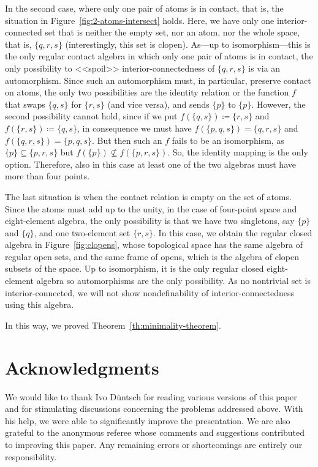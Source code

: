 \documentclass[a4paper,12pt]{amsart}
\numberwithin{equation}{section}
\theoremstyle{mytheoremstyle}
\begin{document}
In the second case, where only one pair of atoms is in contact, that is, the situation
in Figure~\ref{fig:2-atoms-intersect} holds. Here, we have only one interior-connected
set that is neither the empty set, nor an atom, nor the whole space, that is,
$\{q,r,s\}$ (interestingly, this set is clopen).
As---up to isomorphism---this is the only regular contact algebra in which
only one pair of atoms is in contact, the only possibility to <<spoil>>
interior-connectedness of $\{q,r,s\}$ is via an automorphism. Since such
an automorphism must, in particular, preserve contact on atoms, the only
two possibilities are the identity relation or the function $f$ that swaps
$\{q,s\}$ for $\{r,s\}$ (and vice versa), and sends $\{p\}$ to
$\{p\}$. However, the second possibility cannot hold, since if we put
$f(\{q,s\})\coloneqq \{r,s\}$ and $f(\{r,s\})\coloneqq \{q,s\}$, in consequence
we must have $f(\{p,q,s\})=\{q,r,s\}$ and $f(\{q,r,s\})=\{p,q,s\}$. But
then such an $f$ fails to be an isomorphism, as
$\{p\}\subseteq \{p,r,s\}$ but $f(\{p\})\nsubseteq f(\{p,r,s\})$. So, the
identity mapping is the only option. Therefore, also in this case at least
one of the two algebras must have more than four points.


The last situation is when the contact relation is empty on the set of
atoms. Since the atoms must add up to the unity, in the case of four-point
space and eight-element algebra, the only possibility is that we have two
singletons, say $\{p\}$ and $\{q\}$, and one two-element set
$\{r,s\}$. In this case, we obtain the regular closed algebra in Figure~\ref{fig:clopens},
whose topological space has the same algebra of regular open sets, and
the same frame of opens, which is the algebra of clopen subsets of the
space. Up to isomorphism, it is the only regular closed eight-element algebra
so automorphisms are the only possibility. As no nontrivial set is interior-connected,
we will not show nondefinability of interior-connectedness using this
algebra.

In this way, we proved Theorem~\ref{th:minimality-theorem}.

\section*{Acknowledgments}

We would like to thank Ivo D\"{u}ntsch for reading various versions of
this paper and for stimulating discussions concerning the problems addressed
above. With his help, we were able to significantly improve the presentation.
We are also grateful to the anonymous referee whose comments and suggestions
contributed to improving this paper. Any remaining errors or shortcomings
are entirely our responsibility.
\end{document}
